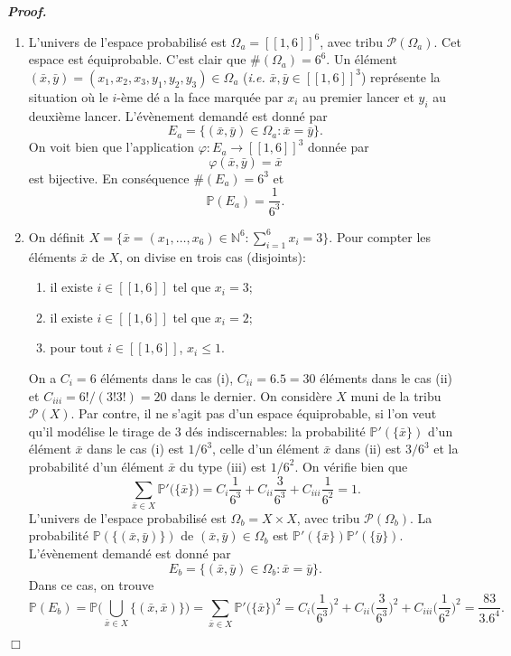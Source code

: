 \documentclass[11pt,a4paper]{article}
\newcommand{\NN}{\mathbb{N}}
\newenvironment{preuve}[1][]
{\vskip 2mm  \noindent\emph{\bf Proof#1. }}{$\Box$ \vskip 2mm}
\let\leq\leqslant
\begin{document}
		\begin{preuve}
			\begin{enumerate}
				\item L'univers de l'espace probabilisé est $\Omega_{a} = [\![ 1, 6 ]\!]^{6}$, avec tribu $\mathscr{P}(\Omega_{a})$. 
				Cet espace est équiprobable. 
				C'est clair que $\#(\Omega_{a}) = 6^{6}$.
				Un élément $(\bar{x},\bar{y}) = (x_{1},x_{2},x_{3},y_{1},y_{2},y_{3}) \in \Omega_{a}$ (\textit{i.e.} $\bar{x}, \bar{y} \in [\![ 1, 6 ]\!]^{3}$) représente la situation où le $i$-ème dé a la face marquée par $x_{i}$ au premier lancer et $y_{i}$ au deuxième lancer.    
				L'évènement demandé est donné par 
				\[     E_{a} = \big\{ (\bar{x},\bar{y}) \in \Omega_{a} : \bar{x} = \bar{y} \big\}.     \]
				On voit bien que l'application $\varphi : E_{a} \rightarrow [\![ 1, 6 ]\!]^{3}$ donnée par
				\[     \varphi(\bar{x},\bar{y}) = \bar{x}    \]
				est bijective. 
				En conséquence $\#(E_{a}) = 6^{3}$ et 
				\[     \mathbb{P}(E_{a}) = \frac{1}{6^{3}}.     \]
				
				\item On définit $X = \{ \bar{x} = (x_{1},\dots,x_{6}) \in \NN^{6} : \sum_{i=1}^{6} x_{i} = 3 \}$. 
				Pour compter les éléments $\bar{x}$ de $X$, on divise en trois cas (disjoints): 
				\begin{enumerate}[label=(\roman*)]
					\item il existe $i \in [\![ 1 , 6 ]\!]$ tel que $x_{i} = 3$;
					\item il existe $i \in [\![ 1 , 6 ]\!]$ tel que $x_{i} = 2$;
					\item pour tout $i \in [\![ 1 , 6 ]\!]$, $x_{i} \leq 1$.
				\end{enumerate}
				On a $C_{i} = 6$ éléments dans le cas (i), $C_{ii} = 6.5 = 30$ éléments dans le cas (ii) et $C_{iii} = 6!/(3! 3!) = 20$ dans le dernier. 
				On considère $X$ muni de la tribu $\mathscr{P}(X)$. 
				Par contre, il ne s'agit pas d'un espace équiprobable, si l'on veut qu'il modélise le tirage de $3$ dés indiscernables: la probabilité $\mathbb{P}'(\{\bar{x}\})$ d'un élément $\bar{x}$ dans le cas (i) est $1/6^{3}$, celle d'un élément $\bar{x}$ dans (ii) est $3/6^{3}$ et la probabilité d'un élément $\bar{x}$ du type (iii) est $1/6^{2}$. 
				On vérifie bien que 
				\[     \sum_{\bar{x} \in X} \mathbb{P}'\big(\{\bar{x}\}\big) = C_{i} \frac{1}{6^{3}} + C_{ii} \frac{3}{6^{3}} + C_{iii} \frac{1}{6^{2}} = 1.     \]
				L'univers de l'espace probabilisé est $\Omega_{b} = X \times X$, avec tribu $\mathscr{P}(\Omega_{b})$. 
				La probabilité $\mathbb{P}(\{ (\bar{x},\bar{y})\} )$ de $(\bar{x},\bar{y}) \in \Omega_{b}$ est $\mathbb{P}'(\{\bar{x}\}) \mathbb{P}'(\{\bar{y}\})$. 
				L'évènement demandé est donné par 
				\[     E_{b} = \big\{ (\bar{x},\bar{y}) \in \Omega_{b} : \bar{x} = \bar{y} \big\}.     \]
				Dans ce cas, on trouve 
				\[     \mathbb{P}(E_{b}) = \mathbb{P}\bigg( \bigcup_{\bar{x} \in X} \big\{ (\bar{x},\bar{x})\big\} \bigg) 
				= \sum_{\bar{x} \in X} \mathbb{P}'\big(\{\bar{x}\}\big)^{2} = C_{i} \Big( \frac{1}{6^{3}} \Big)^{2} + C_{ii} \Big( \frac{3}{6^{3}} \Big)^{2} + C_{iii} \Big( \frac{1}{6^{2}} \Big)^{2} = \frac{83}{3.6^{4}}.     \]
			\end{enumerate}
		\end{preuve}
		
\end{document}
